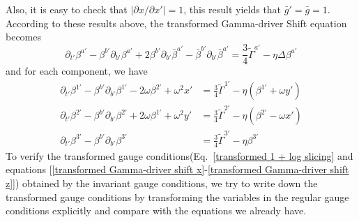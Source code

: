 \documentclass[letterpaper,nofootinbib,prd,amsmath,onecolumn]{revtex4-1}
\begin{document}
Also, it is easy to check that $|\partial x/\partial x'| = 1$, this result yields that ${\bar g}' = {\bar g} = 1$. According to these results above, the transformed Gamma-driver Shift equation becomes
\begin{equation}
\partial_{t'}\beta^{a'} - \beta^{b'}\partial_{b'}\beta^{a'} + 2\beta^{b'}\partial_{b'}{\bar \beta}^{a'} - {\bar \beta}^{b'}\partial_{b'}{\bar \beta}^{a'} = \frac{3}{4}{\tilde \Gamma}^{a'} - \eta \Delta \beta^{a'}
\end{equation}
and for each component, we have
\begin{align}
\partial_{t'}\beta^{1'} - \beta^{b'}\partial_{b'}\beta^{1'} - 2\omega\beta^{2'} + \omega^{2}x' &= \frac{3}{4}{\tilde \Gamma}^{1'} - \eta (\beta^{1'} + \omega y')\label{transformed Gamma-driver shift x}\\
\partial_{t'}\beta^{2'} - \beta^{b'}\partial_{b'}\beta^{2'} + 2\omega\beta^{1'} + \omega^{2}y' &= \frac{3}{4}{\tilde \Gamma}^{2'} - \eta (\beta^{2'} - \omega x')\label{transformed Gamma-driver shift y}\\
\partial_{t'}\beta^{3'} - \beta^{b'}\partial_{b'}\beta^{3'} & = \frac{3}{4}{\tilde \Gamma}^{3'} - \eta \beta^{3'}\label{transformed Gamma-driver shift z}
\end{align}
To verify the transformed gauge conditions(Eq.~\ref{transformed 1 + log slicing} and equations [\ref{transformed Gamma-driver shift x}-\ref{transformed Gamma-driver shift z}]) obtained by the invariant gauge conditions, we try to write down the transformed gauge conditions by transforming the variables in the regular gauge conditions explicitly and compare with the equations we already have. 
\end{document}
